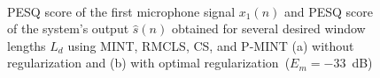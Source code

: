 \documentclass[10pt]{IEEEtran}
\begin{document}
\begin{figure}[b]
\centering
\hbox{\hspace{-0.5cm}
}
\caption{PESQ score of the first microphone signal $x_1(n)$ and PESQ score of the system's output $\hat{s}(n)$ obtained for several desired window lengths $L_d$ using MINT, RMCLS, CS, and P-MINT (a) without regularization and (b) with optimal regularization~($E_m = -33$~dB)}
\end{figure}
\end{document}
